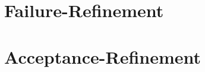 


\section{Failure-Refinement}
\label{sec_failure-refinement}


\section{Acceptance-Refinement}
\label{sec_acceptance-refinement}
